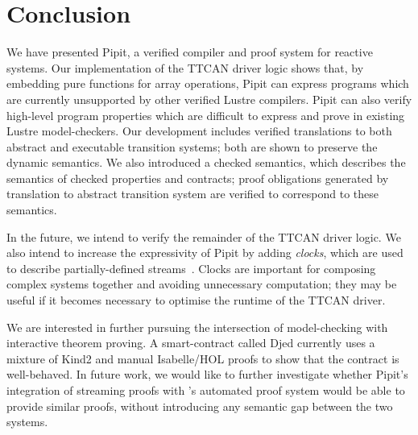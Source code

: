\documentclass[a4paper,UKenglish,cleveref, autoref, thm-restate,anonymous]{lipics-v2021}
\begin{document}
 

\section{Conclusion}

We have presented Pipit, a verified compiler and proof system for reactive systems.
Our implementation of the TTCAN driver logic shows that, by embedding pure \fstar{} functions for array operations, Pipit can express programs which are currently unsupported by other verified Lustre compilers.
Pipit can also verify high-level program properties which are difficult to express and prove in existing Lustre model-checkers.
Our development includes verified translations to both abstract and executable transition systems; both are shown to preserve the dynamic semantics.
We also introduced a checked semantics, which describes the semantics of checked properties and contracts; proof obligations generated by translation to abstract transition system are verified to correspond to these semantics.

In the future, we intend to verify the remainder of the TTCAN driver logic.
We also intend to increase the expressivity of Pipit by adding \emph{clocks}, which are used to describe partially-defined streams~\cite{caspi1995functional}.
Clocks are important for composing complex systems together and avoiding unnecessary computation; they may be useful if it becomes necessary to optimise the runtime of the TTCAN driver.

We are interested in further pursuing the intersection of model-checking with interactive theorem proving.
A smart-contract called Djed \cite{zahnentferner2023djed} currently uses a mixture of Kind2 \cite{champion2016kind2} and manual Isabelle/HOL proofs to show that the contract is well-behaved.
In future work, we would like to further investigate whether Pipit's integration of streaming proofs with \fstar{}'s automated proof system would be able to provide similar proofs, without introducing any semantic gap between the two systems.
 


\end{document}
